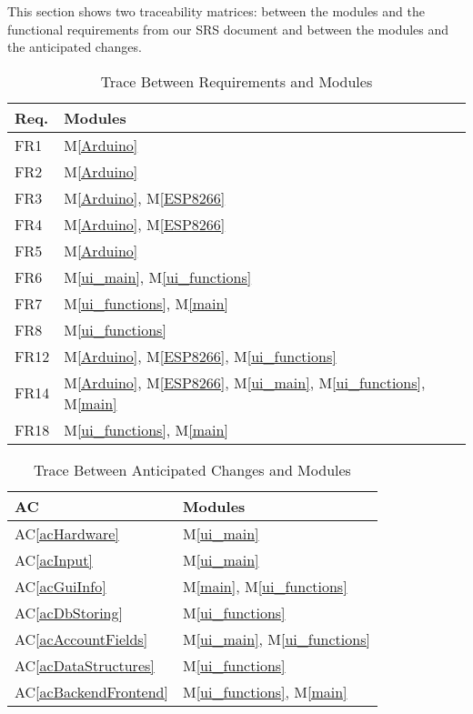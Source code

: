 \documentclass[12pt, titlepage]{article}
\newcommand{\acref}[1]{AC\ref{#1}}
\newcommand{\mref}[1]{M\ref{#1}}
\begin{document}
This section shows two traceability matrices: between the modules and the
functional requirements from our SRS document and between the modules and the anticipated changes.


\begin{table}[H]
\centering
\begin{tabular}{p{} p{}}
\toprule
\textbf{Req.} & \textbf{Modules}\\
\midrule
FR1 & \mref{Arduino}\\
FR2 & \mref{Arduino}\\
FR3 & \mref{Arduino}, \mref{ESP8266}\\
FR4 & \mref{Arduino}, \mref{ESP8266}\\
FR5 & \mref{Arduino}\\
FR6 & \mref{ui_main}, \mref{ui_functions}\\
FR7 & \mref{ui_functions}, \mref{main}\\
FR8 & \mref{ui_functions}\\
FR12 & \mref{Arduino}, \mref{ESP8266}, \mref{ui_functions}\\
FR14 & \mref{Arduino}, \mref{ESP8266}, \mref{ui_main}, \mref{ui_functions}, \mref{main}\\
FR18 & \mref{ui_functions}, \mref{main}\\
\bottomrule
\end{tabular}
\caption{Trace Between Requirements and Modules}
\label{TblRT}
\end{table}

\begin{table}[H]
\centering
\begin{tabular}{p{} p{}}
\toprule
\textbf{AC} & \textbf{Modules}\\
\midrule
\acref{acHardware} & \mref{ui_main}\\
\acref{acInput} & \mref{ui_main}\\
\acref{acGuiInfo} & \mref{main}, \mref{ui_functions}\\
\acref{acDbStoring} & \mref{ui_functions}\\
\acref{acAccountFields} & \mref{ui_main}, \mref{ui_functions}\\
\acref{acDataStructures} & \mref{ui_functions}\\
\acref{acBackendFrontend} & \mref{ui_functions}, \mref{main}\\

\bottomrule
\end{tabular}
\caption{Trace Between Anticipated Changes and Modules}
\label{TblACT}
\end{table}

\newpage{}
\end{document}
